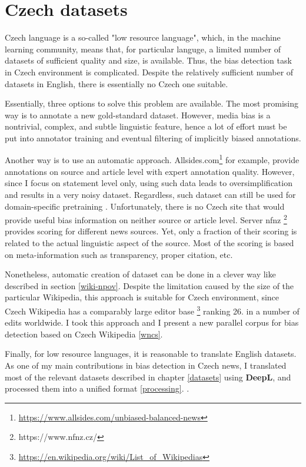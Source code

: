 \chapter{Czech datasets}
Czech language is a so-called "low resource language", which, in the machine learning community, means that, for particular languge, a limited number of datasets of sufficient quality  and size, is available. Thus, the bias detection task in Czech environment is complicated. Despite the relatively sufficient number of datasets in English, there is essentially no Czech one suitable.

 Essentially, three options to solve this problem are available. The most promising way is to annotate a new gold-standard dataset. However, media bias is a nontrivial, complex, and subtle linguistic feature, hence a lot of effort must be put into annotator training and eventual filtering of implicitly biased annotations.
 
 Another way is to use an automatic approach. Allsides.com\footnote{\url{https://www.allsides.com/unbiased-balanced-news}} for example, provide annotations on source and article level with expert annotation quality. However, since I focus on statement level only, using such data leads to oversimplification and results in a very noisy dataset. Regardless, such dataset can still be used for domain-specific pretraining \cite{Spinde2021f}. Unfortunately, there is no Czech site that would provide useful bias information on neither source or article level. Server \Gls{nfnz} \footnote{https://www.nfnz.cz/} provides scoring for different news sources. Yet, only a fraction of their scoring is related to the actual linguistic aspect of the source. Most of the scoring is based on meta-information such as transparency, proper citation, etc.
 
 Nonetheless, automatic creation of dataset can be done in a clever way like described in section \ref{wiki-npov}. Despite the limitation caused by the size of the particular Wikipedia, this approach is suitable for Czech environment, since Czech Wikipedia has a comparably large editor base \footnote{ \url{https://en.wikipedia.org/wiki/List_of_Wikipedias}} ranking 26. in a number of edits worldwide. I took this approach and I present a new parallel corpus for bias detection based on Czech Wikipedia \ref{wncs}.
 
 Finally, for low resource languages, it is reasonable to translate English datasets. As one of my main contributions in bias detection in Czech news, I translated most of the relevant datasets described in chapter \ref{datasets} using \textbf{DeepL}, and processed them into a unified format \ref{processing}. .
 
